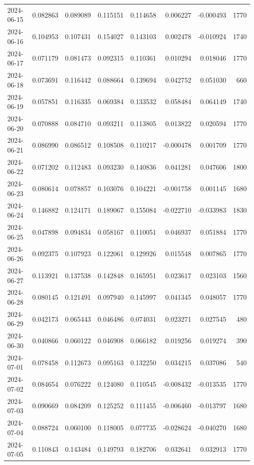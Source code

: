 \begin{tabular}{lrrrrrrr}
2024-06-15 & 0.082863 & 0.089089 & 0.115151 & 0.114658 & 0.006227 & -0.000493 & 1770 \\
2024-06-16 & 0.104953 & 0.107431 & 0.154027 & 0.143103 & 0.002478 & -0.010924 & 1740 \\
2024-06-17 & 0.071179 & 0.081473 & 0.092315 & 0.110361 & 0.010294 & 0.018046 & 1770 \\
2024-06-18 & 0.073691 & 0.116442 & 0.088664 & 0.139694 & 0.042752 & 0.051030 & 660 \\
2024-06-19 & 0.057851 & 0.116335 & 0.069384 & 0.133532 & 0.058484 & 0.064149 & 1740 \\
2024-06-20 & 0.070888 & 0.084710 & 0.093211 & 0.113805 & 0.013822 & 0.020594 & 1770 \\
2024-06-21 & 0.086990 & 0.086512 & 0.108508 & 0.110217 & -0.000478 & 0.001709 & 1770 \\
2024-06-22 & 0.071202 & 0.112483 & 0.093230 & 0.140836 & 0.041281 & 0.047606 & 1800 \\
2024-06-23 & 0.080614 & 0.078857 & 0.103076 & 0.104221 & -0.001758 & 0.001145 & 1680 \\
2024-06-24 & 0.146882 & 0.124171 & 0.189067 & 0.155084 & -0.022710 & -0.033983 & 1830 \\
2024-06-25 & 0.047898 & 0.094834 & 0.058167 & 0.110051 & 0.046937 & 0.051884 & 1770 \\
2024-06-26 & 0.092375 & 0.107923 & 0.122061 & 0.129926 & 0.015548 & 0.007865 & 1770 \\
2024-06-27 & 0.113921 & 0.137538 & 0.142848 & 0.165951 & 0.023617 & 0.023103 & 1560 \\
2024-06-28 & 0.080145 & 0.121491 & 0.097940 & 0.145997 & 0.041345 & 0.048057 & 1770 \\
2024-06-29 & 0.042173 & 0.065443 & 0.046486 & 0.074031 & 0.023271 & 0.027545 & 480 \\
2024-06-30 & 0.040866 & 0.060122 & 0.046908 & 0.066182 & 0.019256 & 0.019274 & 390 \\
2024-07-01 & 0.078458 & 0.112673 & 0.095163 & 0.132250 & 0.034215 & 0.037086 & 540 \\
2024-07-02 & 0.084654 & 0.076222 & 0.124080 & 0.110545 & -0.008432 & -0.013535 & 1770 \\
2024-07-03 & 0.090669 & 0.084209 & 0.125252 & 0.111455 & -0.006460 & -0.013797 & 1680 \\
2024-07-04 & 0.088724 & 0.060100 & 0.118005 & 0.077735 & -0.028624 & -0.040270 & 1680 \\
2024-07-05 & 0.110843 & 0.143484 & 0.149793 & 0.182706 & 0.032641 & 0.032913 & 1770 \\

\end{tabular}
